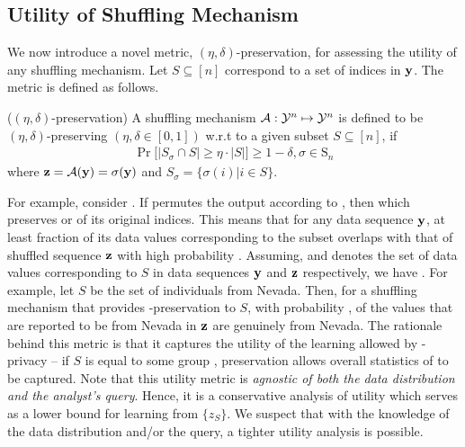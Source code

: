  \subsection{Utility of Shuffling Mechanism}\label{app:utility}
 We now introduce a novel metric, $(\eta,\delta)$-preservation, for assessing the utility of any shuffling mechanism. Let $S\subseteq [n]$ correspond to a set of indices in $\mathbf{y}$. The metric is defined as follows.
\begin{defn}($(\eta,\delta)$-preservation) A shuffling mechanism $\mathcal{A}:\mathcal{Y}^n\mapsto\mathcal{Y}^n$ is defined to be $(\eta,\delta)$-preserving $(\eta, \delta 
\in [0,1])$ w.r.t to a given subset $S\subseteq [n]$, if \begin{gather}\Pr\big[|S_{\sigma}\cap S|\geq \eta\cdot|S|\big]\geq 1-\delta,  \sigma \in \mathrm{S}_n\end{gather} where $\mathbf{z}=\mathcal{A}(\mathbf{y})=\sigma(\mathbf{y})$ and $S_{\sigma}=\{\sigma(i)|i \in S\}$. \label{def:utility} 
\end{defn}
For example, consider . If \scalebox{0.9}{$\calA(\cdot)$} permutes the output according to  , then    which preserves \scalebox{0.9}{$4$} or \scalebox{0.9}{$80\%$} of its original indices.  This means that for any data sequence $\mathbf{y}$, at least \scalebox{0.9}{$\eta$} fraction of its data values corresponding to the subset \scalebox{0.9}{$S$} overlaps with that of shuffled sequence $\mathbf{z}$ with high probability \scalebox{0.9}{$(1-\delta)$}. Assuming,  and  denotes the set of data values corresponding to $S$ in data sequences $\mathbf{y}$ and $\mathbf{z}$ respectively, we  have .
For example, let $S$ be the set of individuals from Nevada. Then, for a shuffling mechanism that provides \scalebox{0.9}{$(\eta =0.8, \delta=0.1)$}-preservation to $S$, with probability \scalebox{0.9}{$\geq 0.9$}, \scalebox{0.9}{$\geq 80\%$} of the values that are reported to be from Nevada in $\mathbf{z}$ are genuinely from Nevada. The rationale behind this metric is that it captures the utility of the learning allowed by \name-privacy -- if $S$ is equal to some group \scalebox{0.9}{$G \in \calG$}, \scalebox{0.9}{$(\eta, \delta)$} preservation allows overall statistics of \scalebox{0.9}{$G$} to be captured. Note that this utility metric is \textit{agnostic of both the data distribution and the analyst's query}. Hence, it is a conservative analysis of utility which serves as a lower bound for learning from $\{z_S\}$. We suspect that with the knowledge of the data distribution and/or the query, a tighter utility analysis is possible. \\
